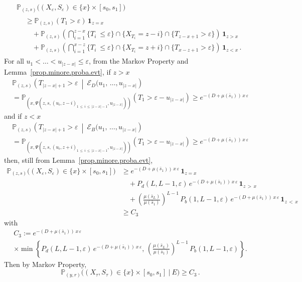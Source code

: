 \documentclass[AHL,Unicode,longabstracts,published]{cedram}
\newcommand{\PP}{\mathbb{P}}
\newcommand{\clE}{\mathcal{E}}
\newcommand{\barmu}{\mu(\bar s_1)}
\newcommand{\1}{\mathbf{1}}
\begin{document}
\begin{multline*}
\PP_{(z,s)}
\big((X_{\varepsilon},S_{\varepsilon})\in\{x\}\times [s_0,s_1]\big)
\\
\begin{aligned}
&\geq
\PP_{(z,s)}
\left(T_1>\varepsilon \right)\,\1_{z=x}
\\
&\quad + \PP_{(z,s)}
\left(\bigcap_{i=1}^{z-x}\{T_i\ \leq \varepsilon\} \cap \{ X_{T_i} = z-i \} \cap \{T_{z-x+1}>\varepsilon\}\right)\,\1_{z>x}
\\
&\quad +\PP_{(z,s)}
\left(\bigcap_{i=1}^{x-z}\{T_i\ \leq \varepsilon\} \cap \{ X_{T_i} = z+i \} \cap \{T_{x-z+1}>\varepsilon\}\right)\,\1_{z<x}\,.
\end{aligned}
\end{multline*}
For all $u_1<\dots < u_{|z-x|}\leq\varepsilon$, from the Markov Property and Lemma~\ref{prop.minore.proba.evt}, if $z>x$
\begin{multline*}
\PP_{(z,s)}\left(T_{|z-x|+1}>\varepsilon \ \middle|\ \clE_D(u_1,\,\dots,u_{|z-x|}\right) \\
= \PP_{(x,\Psi(z,s,(u_i,z-i)_{1\,\leq\,i\,\leq\,|z-x|-1},u_{|z-x|}))}\left(T_1>\varepsilon-u_{|z-x|}\right)
\geq e^{-(D+\barmu)\,x\,\varepsilon}
\end{multline*}
and if $z<x$
\begin{multline*}
\PP_{(z,s)}\left(T_{|z-x|+1}>\varepsilon \ \middle|\ \clE_B(u_1,\,\dots,u_{|z-x|}\right) \\
= \PP_{(x,\Psi(z,s,(u_i,z+i)_{1\,\leq\,i\,\leq\,|z-x|-1},u_{|z-x|}))}\left(T_1>\varepsilon-u_{|z-x|}\right)
\geq e^{-(D+\barmu)\,x\,\varepsilon}
\end{multline*}
then, still from Lemma~\ref{prop.minore.proba.evt},
\begin{align*}
\PP_{(z,s)}
\big((X_{\varepsilon},S_{\varepsilon})\in\{x\}\times [s_0,s_1]\big) & \geq e^{-(D+\barmu)\,x\,\varepsilon}\,\1_{z=x}
\\
& \quad + P_d(L, L-1,\varepsilon)\,e^{-(D+\barmu)\,x\,\varepsilon}\,\1_{z\,>\,x}
\\
& \quad +\left(\frac{\mu(\bar s_L)}{\barmu}\right)^{ L-1}\,P_b(1, L-1, \varepsilon)\, e^{-(D+\barmu)\,x\,\varepsilon}\,\1_{z\,<\,x}
\\
&\geq C_3
\end{align*}
with
\begin{multline*}
C_3:=e^{-(D+\barmu)\,x\,\varepsilon}\\
\times
\min\left\{P_d(L, L-1,\varepsilon)\,e^{-(D+\barmu)\,x\,\varepsilon},\,
\left(\frac{\mu(\bar s_L)}{\barmu}\right)^{ L-1}\,P_b(1, L-1, \varepsilon)\right\}.
\end{multline*}
Then by Markov Property,
\begin{equation}\label{lemma.reach.small.substrate.proba3}
\PP_{(y,r)}
\big((X_\tau,S_\tau)\in\{x\}\times [s_0,s_1] \ \big| \ E \big)
\geq C_3\,.
\end{equation}
\end{document}
